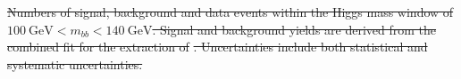 \documentclass[PAPER, american,coverpage,texlive=2016, english]{\ATLASLATEXPATH atlasdoc}
\newcommand*{\muVBF}{\ensuremath{\mu_{\text{VBF}}}\xspace}
\providecommand{\DIFdel}[1]{{\protect\color{red}\sout{#1}}}                      %
\providecommand{\DIFdelbegin}{} %
\providecommand{\DIFdelFL}[1]{\DIFdel{#1}} %
\begin{document}
\DIFdelbegin %
{%
\DIFdelFL{Numbers of signal, background and data events within the Higgs mass window of $\SI{100}{\GeV} < m_{bb} < \SI{140}{\GeV}$. Signal and background yields are derived from the combined fit for the extraction of }%
\DIFdelFL{. Uncertainties include both statistical and systematic uncertainties.}}
\end{document}
